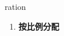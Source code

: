 
\begin{frame}
{\huge ration}
\begin{center}
\begin{enumerate}\Large
  \item \textbf{按比例分配}
\end{enumerate}
\end{center}
\end{frame}

